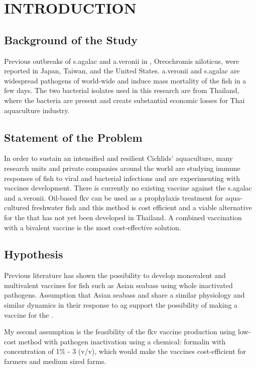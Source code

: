 \setlength{\footskip}{8mm}

\chapter{INTRODUCTION}

\section{Background of the Study}

Previous outbreaks of \ac{s.agalac}\label{acro:s.agalac} and \ac{a.veronii} in , Oreochromis niloticus, were reported in Japan, Taiwan, and the United States. \ac{a.veronii} and \ac{s.agalac} are widespread pathogens of  world-wide  and induce mass mortality of the fish in a few days. The two bacterial isolates used in this research are from Thailand, where the bacteria are present and create substantial economic losses for Thai aquaculture industry.

\section{Statement of the Problem}

In order to sustain an intensified and resilient Cichlids' aquaculture, many research units and private companies around the world are studying immune responses of fish to viral and bacterial infections and are experimenting with vaccines development. There is currently no existing vaccine against the \ac{s.agalac} and \ac{a.veronii}. Oil-based \ac{fkv} can be used as a prophylaxis treatment for aqua-cultured freshwater fish and this method is cost efficient and a viable alternative for the  that has not yet been developed in Thailand. A combined vaccination with a bivalent vaccine is the most cost-effective solution.

\section{Hypothesis}

Previous literature has shown the possibility to develop monovalent and multivalent vaccines for fish such as Asian seabass using whole inactivated pathogens. Assumption that Asian seabass and  share a similar physiology and similar dynamics in their response to \ac{ag} support the possibility of making a vaccine for the .

My second assumption is the feasibility of the \acs{fkv} vaccine production using low-cost method with pathogen inactivation using a chemical: formalin with concentration of 1\% - 3 \acs{(v/v)}, which would make the vaccines cost-efficient for farmers and medium sized farms. 

